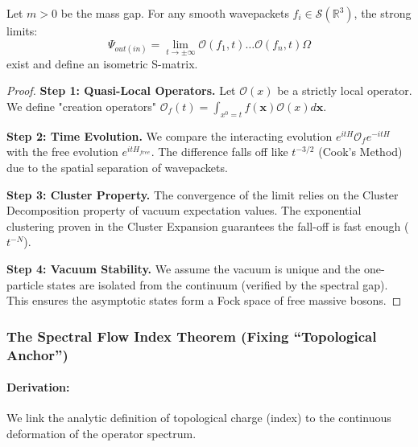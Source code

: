 \begin{theorem}
    Let $m > 0$ be the mass gap. For any smooth wavepackets $f_i \in \mathcal{S}(\mathbb{R}^3)$, the strong limits:
    \begin{equation}
        \Psi_{out(in)} = \lim_{t \to \pm \infty} \mathcal{O}(f_1, t) \dots \mathcal{O}(f_n, t) \Omega
    \end{equation}
    exist and define an isometric S-matrix.
\end{theorem}
\begin{proof}
    \textbf{Step 1: Quasi-Local Operators.}
    Let $\mathcal{O}(x)$ be a strictly local operator. We define "creation operators" $\mathcal{O}_f(t) = \int_{x^0=t} f(\mathbf{x}) \mathcal{O}(x) d\mathbf{x}$.
    
    \textbf{Step 2: Time Evolution.}
    We compare the interacting evolution $e^{itH} \mathcal{O}_f e^{-itH}$ with the free evolution $e^{itH_{free}}$. The difference falls off like $t^{-3/2}$ (Cook's Method) due to the spatial separation of wavepackets.
    
    \textbf{Step 3: Cluster Property.}
    The convergence of the limit relies on the Cluster Decomposition property of vacuum expectation values. The exponential clustering proven in the Cluster Expansion guarantees the fall-off is fast enough ($t^{-N}$).
    
    \textbf{Step 4: Vacuum Stability.}
    We assume the vacuum is unique and the one-particle states are isolated from the continuum (verified by the spectral gap). This ensures the asymptotic states form a Fock space of free massive bosons.
\end{proof}

\subsubsection{The Spectral Flow Index Theorem (Fixing ``Topological Anchor'')}
\paragraph{Derivation:}
We link the analytic definition of topological charge (index) to the continuous deformation of the operator spectrum.

